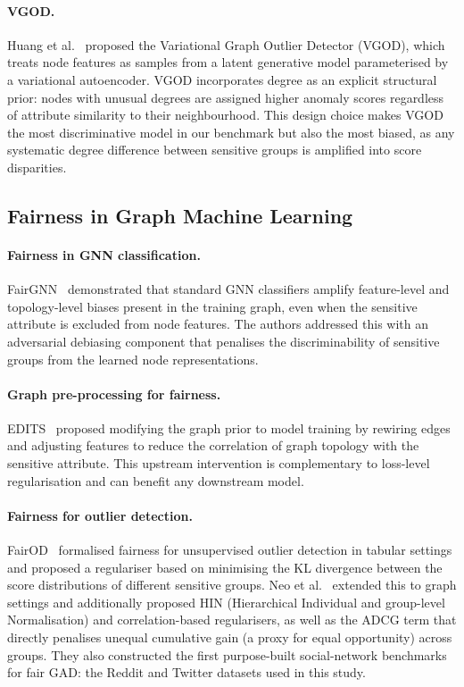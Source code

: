 \documentclass[sigconf,natbib=false]{acmart}
\begin{document}
\paragraph{VGOD.}
Huang et al.~\cite{huang2022vgod} proposed the Variational Graph Outlier Detector (VGOD), which treats node features as samples from a latent generative model parameterised by a variational autoencoder. VGOD incorporates degree as an explicit structural prior: nodes with unusual degrees are assigned higher anomaly scores regardless of attribute similarity to their neighbourhood. This design choice makes VGOD the most discriminative model in our benchmark but also the most biased, as any systematic degree difference between sensitive groups is amplified into score disparities.

\subsection{Fairness in Graph Machine Learning}

\paragraph{Fairness in GNN classification.}
FairGNN~\cite{dai2021say} demonstrated that standard GNN classifiers amplify feature-level and topology-level biases present in the training graph, even when the sensitive attribute is excluded from node features. The authors addressed this with an adversarial debiasing component that penalises the discriminability of sensitive groups from the learned node representations.

\paragraph{Graph pre-processing for fairness.}
EDITS~\cite{dong2022edits} proposed modifying the graph prior to model training by rewiring edges and adjusting features to reduce the correlation of graph topology with the sensitive attribute. This upstream intervention is complementary to loss-level regularisation and can benefit any downstream model.

\paragraph{Fairness for outlier detection.}
FairOD~\cite{shekhar2021fairod} formalised fairness for unsupervised outlier detection in tabular settings and proposed a regulariser based on minimising the KL divergence between the score distributions of different sensitive groups. Neo et al.~\cite{neoFairGraphAnomaly2024a} extended this to graph settings and additionally proposed HIN (Hierarchical Individual and group-level Normalisation) and correlation-based regularisers, as well as the ADCG term that directly penalises unequal cumulative gain (a proxy for equal opportunity) across groups. They also constructed the first purpose-built social-network benchmarks for fair GAD: the Reddit and Twitter datasets used in this study.
\end{document}
